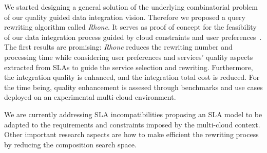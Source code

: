 We started designing a general solution of the underlying combinatorial problem of our quality guided data integration vision. Therefore we proposed  a query rewriting algorithm called \textit{Rhone}. It serves as proof of concept for the feasibility of our data integration process guided by cloud constraints and user preferences~\cite{carvalho2016}. The first results are promising: \textit{Rhone} reduces the rewriting number and processing time while considering user preferences and services' quality aspects extracted from SLAs to guide the service selection and rewriting. Furthermore, the integration quality is enhanced, and the integration total cost is reduced. For the time being, quality enhancement is  assesed through benchmarks and use cases deployed on an experimental multi-cloud environment. 

We are currently addressing SLA incompatibilities proposing an SLA model   to be adapted to the requirements and constraints imposed by the multi-cloud context.  Other important research aspects are how to make efficient the rewriting process by reducing the composition search space. 